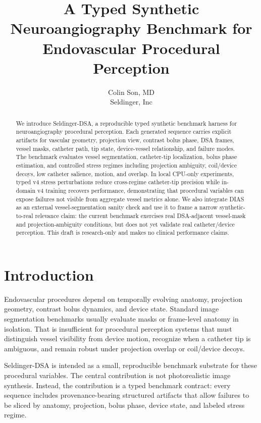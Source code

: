\documentclass[10pt]{article}
\title{A Typed Synthetic Neuroangiography Benchmark for Endovascular Procedural Perception}
\author{Colin Son, MD \\ Seldinger, Inc}
\begin{document}
\maketitle

\begin{abstract}
We introduce Seldinger-DSA, a reproducible typed synthetic benchmark harness for neuroangiography procedural perception. Each generated sequence carries explicit artifacts for vascular geometry, projection view, contrast bolus phase, DSA frames, vessel masks, catheter path, tip state, device-vessel relationship, and failure modes. The benchmark evaluates vessel segmentation, catheter-tip localization, bolus phase estimation, and controlled stress regimes including projection ambiguity, coil/device decoys, low catheter salience, motion, and overlap. In local CPU-only experiments, typed v4 stress perturbations reduce cross-regime catheter-tip precision while in-domain v4 training recovers performance, demonstrating that procedural variables can expose failures not visible from aggregate vessel metrics alone. We also integrate DIAS as an external vessel-segmentation sanity check and use it to frame a narrow synthetic-to-real relevance claim: the current benchmark exercises real DSA-adjacent vessel-mask and projection-ambiguity conditions, but does not yet validate real catheter/device perception. This draft is research-only and makes no clinical performance claims.
\end{abstract}

\section{Introduction}
Endovascular procedures depend on temporally evolving anatomy, projection geometry, contrast bolus dynamics, and device state. Standard image segmentation benchmarks usually evaluate masks or frame-level anatomy in isolation. That is insufficient for procedural perception systems that must distinguish vessel visibility from device motion, recognize when a catheter tip is ambiguous, and remain robust under projection overlap or coil/device decoys.

Seldinger-DSA is intended as a small, reproducible benchmark substrate for these procedural variables. The central contribution is not photorealistic image synthesis. Instead, the contribution is a typed benchmark contract: every sequence includes provenance-bearing structured artifacts that allow failures to be sliced by anatomy, projection, bolus phase, device state, and labeled stress regime.
\end{document}
